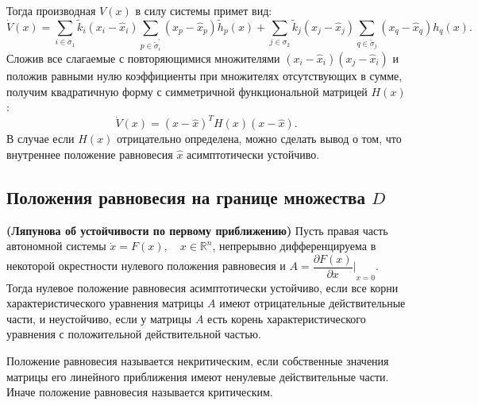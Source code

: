 \documentclass[14pt,a4paper]{extarticle}
\begin{document}
	Тогда производная $V(x)$ в силу системы примет вид:
	\[\dot{V}(x)=\sum\limits_{i\in\sigma_1}\tilde{k}_i(x_i-\hat{x}_i)\sum\limits_{p\in\tilde{\sigma}^\prime_i}(x_p-\hat{x}_p)\tilde{h}_{p}(x)+\sum\limits_{j\in\sigma_2}\tilde{k}_j(x_j-\hat{x}_j)\sum\limits_{q\in\tilde{\sigma}_j}(x_q-\hat{x}_q)h_{q}(x).\]
	Сложив все слагаемые с повторяющимися множителями $(x_i-\hat{x}_i)(x_j-\hat{x}_i)$ и положив равными нулю коэффициенты при множителях отсутствующих в сумме, получим квадратичную форму с симметричной функциональной матрицей $H(x)$:
	\[\dot{V}(x)=(x-\hat{x})^{T}H(x)(x-\hat{x}).\]
	В случае если $H(x)$ отрицательно определена, можно сделать вывод о том, что внутреннее положение равновесия $\hat{x}$ асимптотически устойчиво. 

	\subsection{Положения равновесия на границе множества $D$}
	
	\begin{theorem}\textbf{(Ляпунова об устойчивости по первому приближению)}
		Пусть правая часть автономной системы $\dot{x} = F(x),\quad x\in\mathbb{R}^n$, непрерывно дифференцируема в некоторой окрестности нулевого положения равновесия и $A = {\dfrac{\partial F(x)}{\partial x}\biggr\rvert}_{x=0}$. Тогда нулевое положение равновесия асимптотически устойчиво, если все корни характеристического уравнения матрицы $A$ имеют отрицательные действительные части, и неустойчиво, если у матрицы $A$ есть корень характеристического уравнения с положительной действительной частью.
	\end{theorem}
	
	\begin{definition}
		Положение равновесия называется некритическим, если собственные значения матрицы его линейного приближения имеют ненулевые действительные части. Иначе положение равновесия называется критическим. 
	\end{definition}
	
\end{document}
